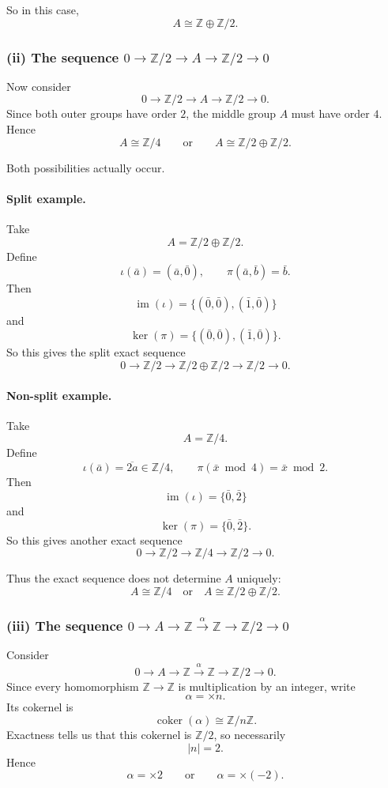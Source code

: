 \documentclass[12pt,a4paper]{article}
\theoremstyle{notespace}
\begin{document}
So in this case,
\[
\boxed{A\cong \mathbb Z\oplus \mathbb Z/2.}
\]

\subsubsection*{(ii) The sequence \(0\to \mathbb Z/2\to A\to \mathbb Z/2\to 0\)}

Now consider
\[
0\longrightarrow \mathbb Z/2 \longrightarrow A \longrightarrow \mathbb Z/2 \longrightarrow 0.
\]
Since both outer groups have order \(2\), the middle group \(A\) must have order \(4\). Hence
\[
A\cong \mathbb Z/4
\qquad
\text{or}
\qquad
A\cong \mathbb Z/2\oplus \mathbb Z/2.
\]

Both possibilities actually occur.

\paragraph{Split example.}
Take
\[
A=\mathbb Z/2\oplus \mathbb Z/2.
\]
Define
\[
\iota(\bar a)=(\bar a,\bar 0),
\qquad
\pi(\bar a,\bar b)=\bar b.
\]
Then
\[
\operatorname{im}(\iota)=\{(\bar 0,\bar 0),(\bar 1,\bar 0)\}
\]
and
\[
\ker(\pi)=\{(\bar 0,\bar 0),(\bar 1,\bar 0)\}.
\]
So this gives the split exact sequence
\[
0\to \mathbb Z/2\to \mathbb Z/2\oplus \mathbb Z/2\to \mathbb Z/2\to 0.
\]

\paragraph{Non-split example.}
Take
\[
A=\mathbb Z/4.
\]
Define
\[
\iota(\bar a)=\overline{2a}\in \mathbb Z/4,
\qquad
\pi(\bar x \bmod 4)=\bar x \bmod 2.
\]
Then
\[
\operatorname{im}(\iota)=\{\bar 0,\bar 2\}
\]
and
\[
\ker(\pi)=\{\bar 0,\bar 2\}.
\]
So this gives another exact sequence
\[
0\to \mathbb Z/2\to \mathbb Z/4\to \mathbb Z/2\to 0.
\]

Thus the exact sequence does not determine \(A\) uniquely:
\[
\boxed{A\cong \mathbb Z/4
	\quad\text{or}\quad
	A\cong \mathbb Z/2\oplus \mathbb Z/2.}
\]

\subsubsection*{(iii) The sequence \(0\to A\to \mathbb Z\xrightarrow{\alpha}\mathbb Z\to \mathbb Z/2\to 0\)}

Consider
\[
0\longrightarrow A \longrightarrow \mathbb Z \xrightarrow{\alpha} \mathbb Z \longrightarrow \mathbb Z/2 \longrightarrow 0.
\]
Since every homomorphism \(\mathbb Z\to \mathbb Z\) is multiplication by an integer, write
\[
\alpha=\times n.
\]
Its cokernel is
\[
\operatorname{coker}(\alpha)\cong \mathbb Z/n\mathbb Z.
\]
Exactness tells us that this cokernel is \(\mathbb Z/2\), so necessarily
\[
|n|=2.
\]
Hence
\[
\alpha=\times 2
\qquad
\text{or}
\qquad
\alpha=\times (-2).
\]
\end{document}
